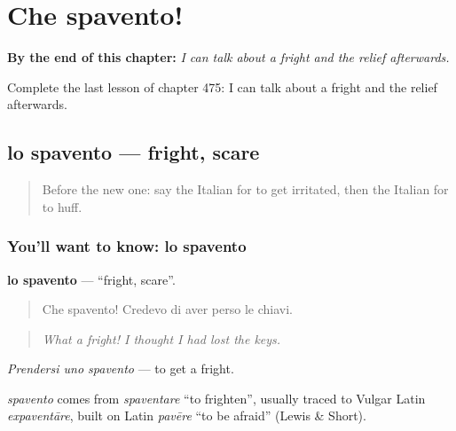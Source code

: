 
\chapter{Che spavento!}
\label{ch:it-che-spavento}

\begin{chapteropening}
\textbf{By the end of this chapter:} \emph{I can talk about a fright and the relief afterwards.}

Complete the last lesson of chapter 475: I can talk about a fright and the relief afterwards.
\end{chapteropening}

\section[lo spavento]{lo spavento — fright, scare}

\label{lesson:IT-C475-spavento}



\begin{quote}
Before the new one: say the Italian for to get irritated, then the Italian for to huff.
\end{quote}

\subsection*{You'll want to know: lo spavento}
\textbf{lo spavento} — \textquotedblleft{}fright, scare\textquotedblright{}.

\begin{quote}
Che spavento! Credevo di aver perso le chiavi.
\end{quote}

\begin{quote}
\emph{What a fright! I thought I had lost the keys.}
\end{quote}

\emph{Prendersi uno spavento} — to get a fright.

\begin{cousinweb}
\emph{spavento} comes from \emph{spaventare} \textquotedblleft{}to frighten\textquotedblright{}, usually traced to Vulgar Latin \emph{expaventāre}, built on Latin \emph{pavēre} \textquotedblleft{}to be afraid\textquotedblright{} (Lewis \& Short).
\end{cousinweb}

